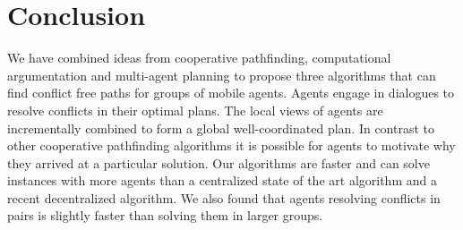 \section{Conclusion}
We have combined ideas from cooperative pathfinding, computational 
argumentation and multi-agent planning to propose three algorithms that can 
find conflict free paths for groups of mobile agents. Agents engage in 
dialogues to resolve conflicts in their optimal plans. The local views of 
agents are incrementally combined to form a global well-coordinated plan.
In contrast to other cooperative pathfinding algorithms it is possible for 
agents to motivate why they arrived at a particular solution.
Our algorithms are faster and can solve instances with more agents than a 
centralized state of the art algorithm and a recent decentralized algorithm.
We also found that agents resolving conflicts in pairs is slightly faster than 
solving them in larger groups.